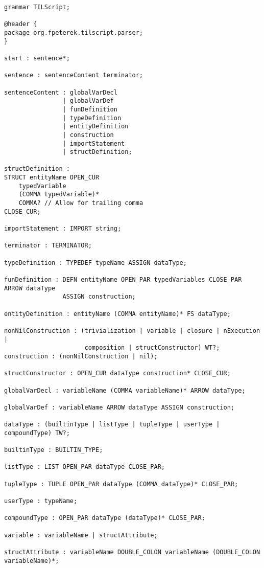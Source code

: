 \begin{lstlisting}[caption=Gramatika jazyka TIL-Script,language=Antlr,escapeinside={{§}{§}}]
grammar TILScript;

@header {
package org.fpeterek.tilscript.parser;
}

start : sentence*;

sentence : sentenceContent terminator;

sentenceContent : globalVarDecl
                | globalVarDef
                | funDefinition
                | typeDefinition
                | entityDefinition
                | construction
                | importStatement
                | structDefinition;

structDefinition :
STRUCT entityName OPEN_CUR
    typedVariable
    (COMMA typedVariable)*
    COMMA? // Allow for trailing comma
CLOSE_CUR;

importStatement : IMPORT string;

terminator : TERMINATOR;

typeDefinition : TYPEDEF typeName ASSIGN dataType;

funDefinition : DEFN entityName OPEN_PAR typedVariables CLOSE_PAR ARROW dataType
                ASSIGN construction;

entityDefinition : entityName (COMMA entityName)* FS dataType;

nonNilConstruction : (trivialization | variable | closure | nExecution |
                      composition | structConstructor) WT?;
construction : (nonNilConstruction | nil);

structConstructor : OPEN_CUR dataType construction* CLOSE_CUR;

globalVarDecl : variableName (COMMA variableName)* ARROW dataType;

globalVarDef : variableName ARROW dataType ASSIGN construction;

dataType : (builtinType | listType | tupleType | userType | compoundType) TW?;

builtinType : BUILTIN_TYPE;

listType : LIST OPEN_PAR dataType CLOSE_PAR;

tupleType : TUPLE OPEN_PAR dataType (COMMA dataType)* CLOSE_PAR;

userType : typeName;

compoundType : OPEN_PAR dataType (dataType)* CLOSE_PAR;

variable : variableName | structAttribute;

structAttribute : variableName DOUBLE_COLON variableName (DOUBLE_COLON variableName)*;


\end{lstlisting}
